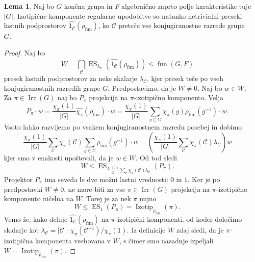 \documentclass[11pt]{book}
\def\conclass{\mathcal{C}}
\DeclareMathOperator\Izotip{Izotip}
\DeclareMathOperator\Irr{Irr}
\DeclareMathOperator\Eigenspace{ES}
\DeclareMathOperator\fun{fun}
\theoremstyle{definition}
\theoremstyle{zgled}
\theoremstyle{odprtproblem}
\theoremstyle{domacanaloga}
\newenvironment{dokaz}
    {\color{siva}\begin{proof}}
    {\end{proof}}
\theoremstyle{izrek}
\newtheorem*{lema}{Lema}
\begin{document}
\begin{lema}
Naj bo $G$ končna grupa in $F$ algebraično zaprto polje karakteristike tuje $|G|$. Izotipične komponente regularne upodobitve so natanko netrivialni preseki lastnih podprostorov $\widehat{1_{\conclass}}(\rho_{\fun})$, ko $\conclass$ preteče vse konjugiranostne razrede grupe $G$.
\end{lema}
\begin{dokaz}
Naj bo
\[
    \textstyle W = \bigcap_{\conclass} \Eigenspace_{\lambda_{\conclass}}\left(\widehat{1_{\conclass}}(\rho_{\fun})\right) \leq \fun(G,F)
\]
presek lastnih podprostorov za neke skalarje $\lambda_{\conclass}$, kjer presek teče po vseh konjugiranostnih razredih grupe $G$. Predpostavimo, da je $W \neq 0$. Naj bo $w \in W$. Za $\pi \in \Irr(G)$ naj bo $P_{\pi}$ projekcija na $\pi$-izotipično komponento. Velja
\[
    P_{\pi} \cdot w = \frac{\chi_{\pi}(1)}{|G|} \widehat{\chi_{\pi}}(\rho_{\fun}) \cdot w =
    \frac{\chi_{\pi}(1)}{|G|} \sum_{g \in G} \chi_{\pi}(g) \rho_{\fun}(g^{-1}) \cdot w.
\]
Vsoto lahko razvijemo po vsakem konjugiranostnem razredu posebej in dobimo
\[
    \frac{\chi_{\pi}(1)}{|G|} \sum_{\conclass} \chi_{\pi}(\conclass) \sum_{g \in \conclass} \rho_{\fun}(g^{-1}) \cdot w =
    \left( \frac{\chi_{\pi}(1)}{|G|} \sum_{\conclass} \chi_{\pi}(\conclass) \lambda_{\conclass} \right) w
\]
kjer smo v enakosti upoštevali, da je $w \in W$. Od tod sledi
\[
    \textstyle W \leq \Eigenspace_{\frac{\chi_{\pi}(1)}{|G|} \sum_{\conclass} \chi_{\pi}(\conclass) \lambda_{\conclass}}(P_{\pi}).
\]
Projektor $P_{\pi}$ ima seveda le dve možni lastni vrednosti: $0$ in $1$. Ker je po predpostavki $W \neq 0$, ne more biti za vse $\pi \in \Irr(G)$ projekcija na $\pi$-izotipično komponento ničelna na $W$. Torej je za nek $\pi$ nujno
\[
    \textstyle W \leq \Eigenspace_{1}(P_{\pi}) = \Izotip_{\rho_{\fun}}(\pi).
\]
Vemo že, kako deluje $\widehat{1_{\conclass}}(\rho_{\fun})$ na $\pi$-izotipični komponenti, od koder določimo skalarje kot $\lambda_{\conclass} = |\conclass| \cdot \chi_{\pi}(\conclass^{-1})/\chi_{\pi}(1)$. Iz definicije $W$ zdaj sledi, da je $\pi$-izotipična komponenta vsebovana v $W$, s čimer smo nazadnje izpeljali $W = \Izotip_{\rho_{\fun}}(\pi)$.
\end{dokaz}
\end{document}

